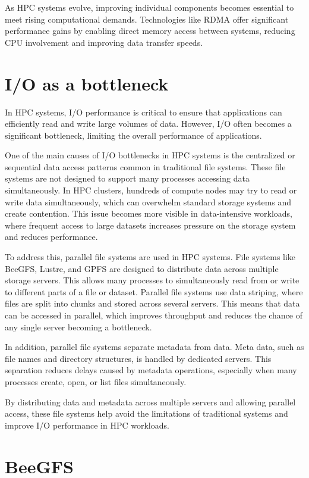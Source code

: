 As HPC systems evolve, improving individual components becomes essential to meet rising computational demands. Technologies like RDMA offer significant performance gains by enabling direct memory access between systems, reducing CPU involvement and improving data transfer speeds. 

\section{I/O as a bottleneck}

In HPC systems, I/O performance is critical to ensure that applications can efficiently read and write large volumes of data. However, I/O often becomes a significant bottleneck, limiting the overall performance of applications.\cite{9355272}

One of the main causes of I/O bottlenecks in HPC systems is the centralized or sequential data access patterns common in traditional file systems. These file systems are not designed to support many processes accessing data simultaneously. In HPC clusters, hundreds of compute nodes may try to read or write data simultaneously, which can overwhelm standard storage systems and create contention. This issue becomes more visible in data-intensive workloads, where frequent access to large datasets increases pressure on the storage system and reduces performance.

To address this, parallel file systems are used in HPC systems. File systems like BeeGFS, Lustre, and GPFS are designed to distribute data across multiple storage servers. This allows many processes to simultaneously read from or write to different parts of a file or dataset. Parallel file systems use data striping, where files are split into chunks and stored across several servers. This means that data can be accessed in parallel, which improves throughput and reduces the chance of any single server becoming a bottleneck.

In addition, parallel file systems separate metadata from data. Meta data, such as file names and directory structures, is handled by dedicated servers. This separation reduces delays caused by metadata operations, especially when many processes create, open, or list files simultaneously.

By distributing data and metadata across multiple servers and allowing parallel access, these file systems help avoid the limitations of traditional systems and improve I/O performance in HPC workloads.

\section{BeeGFS}


